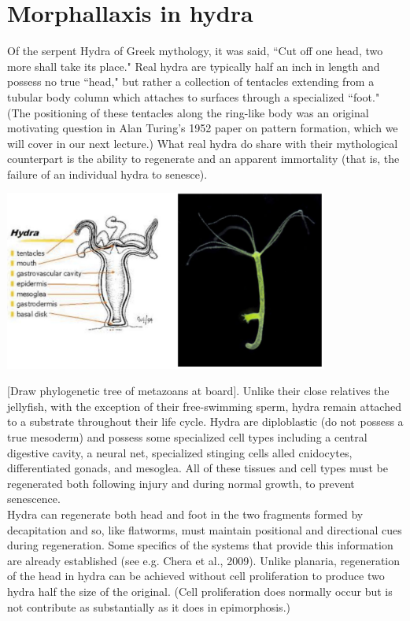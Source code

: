 \documentclass{article}
\begin{document}
\section*{Morphallaxis in hydra}

Of the serpent Hydra of Greek mythology, it was said, ``Cut off one head, two more shall take its place." Real hydra are typically half an inch in length and possess no true ``head," but rather a collection of tentacles extending from a tubular body column which attaches to surfaces through a specialized ``foot." (The positioning of these tentacles along the ring-like body was an original motivating question in Alan Turing's 1952 paper on pattern formation, which we will cover in our next lecture.) What real hydra do share with their mythological counterpart is the ability to regenerate and an apparent immortality (that is, the failure of an individual hydra to senesce).

\begin{center}
\includegraphics[width=0.8\textwidth]{hydra_anatomy.pdf}
\end{center}

[Draw phylogenetic tree of metazoans at board]. Unlike their close relatives the jellyfish, with the exception of their free-swimming sperm, hydra remain attached to a substrate throughout their life cycle. Hydra are diploblastic (do not possess a true mesoderm) and possess some specialized cell types including a central digestive cavity, a neural net, specialized stinging cells alled cnidocytes, differentiated gonads, and mesoglea. All of these tissues and cell types must be regenerated both following injury and during normal growth, to prevent senescence.\\

Hydra can regenerate both head and foot in the two fragments formed by decapitation and so, like flatworms, must maintain positional and directional cues during regeneration. Some specifics of the systems that provide this information are already established (see e.g. Chera et al., 2009). Unlike planaria, regeneration of the head in hydra can be achieved without cell proliferation to produce two hydra half the size of the original. (Cell proliferation does normally occur but is not contribute as substantially as it does in epimorphosis.)
\end{document}
